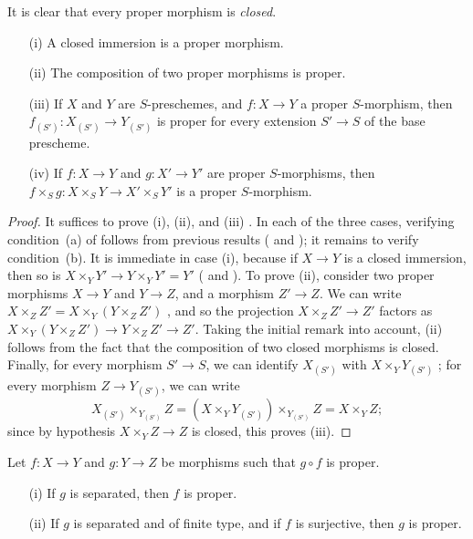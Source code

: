 It is clear that every proper morphism is \emph{closed}.

\begin{proposition}[5.4.2]
\label{II.5.4.2}
\medskip\noindent
\begin{enumerate}
  \item[{\rm(i)}] A closed immersion is a proper morphism.
  \item[{\rm(ii)}] The composition of two proper morphisms is proper.
  \item[{\rm(iii)}] If $X$ and $Y$ are $S$-preschemes, and $f:X\to Y$ a proper $S$-morphism, then $f_{(S')}:X_{(S')}\to Y_{(S')}$ is proper for every extension $S'\to S$ of the base prescheme.
  \item[{\rm(iv)}] If $f:X\to Y$ and $g:X'\to Y'$ are proper $S$-morphisms, then $f\times_S g:X\times_S Y\to X'\times_S Y'$ is a proper $S$-morphism.
\end{enumerate}
\end{proposition}

\begin{proof}
\label{proof-II.5.4.2}
It suffices to prove (i), (ii), and (iii) .
In each of the three cases, verifying condition~(a) of  follows from previous results ( and ); it remains to verify condition~(b).
It is immediate in case (i), because if $X\to Y$ is a closed immersion, then so is $X\times_Y Y'\to Y\times_Y Y'=Y'$ ( and ).
To prove (ii), consider two proper morphisms $X\to Y$ and $Y\to Z$, and a morphism $Z'\to Z$.
We can write $X\times_Z Z'=X\times_Y(Y\times_Z Z')$ , and so the projection $X\times_Z Z'\to Z'$ factors as $X\times_Y(Y\times_Z Z')\to Y\times_Z Z'\to Z'$.
Taking the initial remark into account, (ii) follows from the fact that the composition of two closed morphisms is closed.
Finally, for every morphism $S'\to S$, we can identify $X_{(S')}$ with $X\times_Y Y_{(S')}$ ; for every morphism $Z\to Y_{(S')}$, we can write
\[
  X_{(S')}\times_{Y_{(S')}}Z=(X\times_Y Y_{(S')})\times_{Y_{(S')}}Z=X\times_Y Z;
\]
since by hypothesis $X\times_Y Z\to Z$ is closed, this proves (iii).
\end{proof}

\begin{corollary}[5.4.3]
\label{II.5.4.3}
Let $f:X\to Y$ and $g:Y\to Z$ be morphisms such that $g\circ f$ is proper.
\begin{enumerate}
  \item[{\rm(i)}] If $g$ is separated, then $f$ is proper.
  \item[{\rm(ii)}] If $g$ is separated and of finite type, and if $f$ is surjective, then $g$ is proper.
\end{enumerate}
\end{corollary}

